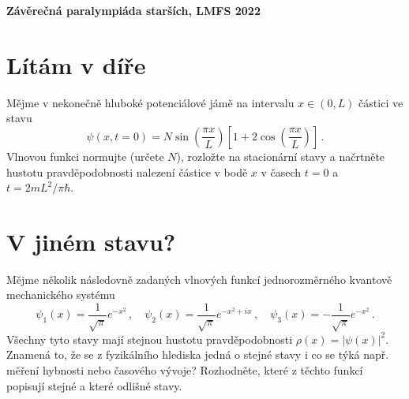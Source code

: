 \documentclass[10pt,a4paper,landscape]{article}
\author{Ondřej Zelenka}
\begin{document}
\pagestyle{empty}
\textbf{\center\LARGE Závěrečná paralympiáda starších, LMFS 2022}

\begin{multicols}{2}[]

\section{Lítám v díře}
Mějme v nekonečně hluboké potenciálové jámě na intervalu $x\in\left(0, L\right)$ částici ve stavu
\begin{equation}
\psi\left(x, t=0\right) = N\sin\left(\frac{\pi x}{L}\right)\left[1 + 2\cos\left(\frac{\pi x}{L}\right)\right] \,.
\end{equation}
Vlnovou funkci normujte (určete $N$), rozložte na stacionární stavy a načrtněte hustotu pravděpodobnosti nalezení částice v bodě $x$ v časech $t = 0$ a $t = 2mL^2/\pi\hbar$.

\section{V jiném stavu?}
Mějme několik následovně zadaných vlnových funkcí jednorozměrného kvantově mechanického systému
\begin{equation}
\psi_1\left(x\right) = \frac{1}{\sqrt{\pi}}e^{-x^2} \,,\quad \psi_2\left(x\right) = \frac{1}{\sqrt{\pi}}e^{-x^2+ix} \,,\quad \psi_3\left(x\right) = -\frac{1}{\sqrt{\pi}}e^{-x^2} \,.
\end{equation}
Všechny tyto stavy mají stejnou hustotu pravděpodobnosti $\rho\left(x\right) = \left|\psi\left(x\right)\right|^2$. Znamená to, že se z fyzikálního hlediska jedná o stejné stavy i co se týká např. měření hybnosti nebo časového vývoje? Rozhodněte, které z těchto funkcí popisují stejné a které odlišné stavy.


\end{multicols}
\end{document}
